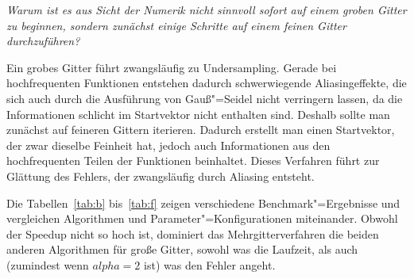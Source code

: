 \documentclass[paper = a4]{scrartcl}
\begin{document}
\emph{Warum ist es aus Sicht der Numerik nicht sinnvoll sofort auf einem groben Gitter zu beginnen, sondern zunächst einige Schritte auf einem feinen Gitter durchzuführen?}

Ein grobes Gitter führt zwangsläufig zu Undersampling. Gerade bei hochfrequenten Funktionen entstehen dadurch schwerwiegende Aliasingeffekte, die sich auch durch die Ausführung von Gauß"=Seidel nicht verringern lassen, da die Informationen schlicht im Startvektor nicht enthalten sind. Deshalb sollte man zunächst auf feineren Gittern iterieren. Dadurch erstellt man einen Startvektor, der zwar dieselbe Feinheit hat, jedoch auch Informationen aus den hochfrequenten Teilen der Funktionen beinhaltet. Dieses Verfahren führt zur Glättung des Fehlers, der zwangsläufig durch Aliasing entsteht.

Die Tabellen~\ref{tab:b} bis~\ref{tab:f} zeigen verschiedene Benchmark"=Ergebnisse und vergleichen Algorithmen und Parameter"=Konfigurationen miteinander. Obwohl der Speedup nicht so hoch ist, dominiert das Mehrgitterverfahren die beiden anderen Algorithmen für große Gitter, sowohl was die Laufzeit, als auch (zumindest wenn \(alpha=2\) ist) was den Fehler angeht.
\end{document}
